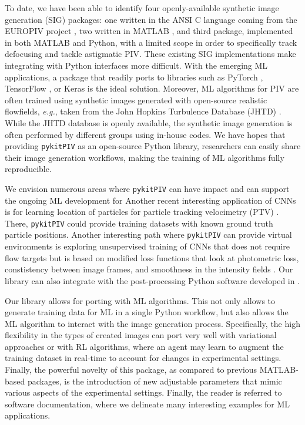 \documentclass[a4paper,fleqn]{cas-dc}
\begin{document}
To date, we have been able to identify four openly-available synthetic image generation (SIG) packages: one written in the ANSI C language coming from the EUROPIV project \cite{lecordier2004europiv}, two written in MATLAB \citep{ben2020openpiv, mendes2020piv}, and third package, implemented in both MATLAB and Python, with a limited scope in order to specifically track defocusing and tackle astigmatic PIV. These existing SIG implementations make integrating with Python interfaces more difficult. With the emerging ML applications, a package that readily ports to libraries such as PyTorch \cite{paszke2017automatic, paszke2019pytorch}, TensorFlow \cite{tensorflow2015}, or Keras \cite{chollet2015keras} is the ideal solution. Moreover, ML algorithms for PIV are often trained using synthetic images generated with open-source realistic flowfields, \textit{e.g.}, taken from the John Hopkins Turbulence Database (JHTD) \cite{perlman2007data}. While the JHTD database is openly available, the synthetic image generation is often performed by different groups using in-house codes. We have hopes that providing \texttt{pykitPIV} as an open-source Python library, researchers can easily share their image generation workflows, making the training of ML algorithms fully reproducible.

We envision numerous areas where \texttt{pykitPIV} can have impact and can support the ongoing ML development for
Another recent interesting application of CNNs is for learning location of particles for particle tracking velocimetry (PTV) \cite{godbersen2024peak}. There, \texttt{pykitPIV} could provide training datasets with known ground truth particle positions.
Another interesting path where \texttt{pykitPIV} can provide virtual environments is exploring unsupervised training of CNNs that does not require flow targets but is based on modified loss functions that look at photometric loss, constistency between image frames, and smoothness in the intensity fields \cite{lagemann2024challenges}. Our library can also integrate with the post-processing Python software developed in \cite{aguilar2022dpivsoft}.

Our library allows for porting with ML algorithms. This not only allows to generate training data for ML in a single Python workflow, but also allows the ML algorithm to interact with the image generation process. Specifically, the high flexibility in the types of created images can port very well with variational approaches or with RL algorithms, where an agent may learn to augment the training dataset in real-time to account for changes in experimental settings. Finally, the powerful novelty of this package, as compared to previous MATLAB-based packages, is the introduction of new adjustable parameters that mimic various aspects of the experimental settings. Finally, the reader is referred to software documentation, where we delineate many interesting examples for ML applications.
\end{document}
